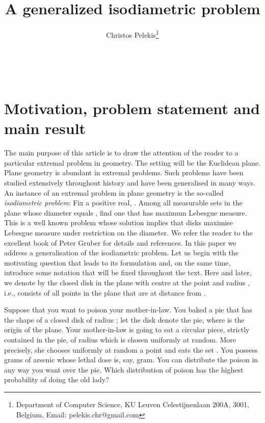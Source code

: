 \documentclass[12pt]{article}
\title{A generalized isodiametric problem}
\author{Christos Pelekis\thanks{Department of Computer Science, KU Leuven
Celestijnenlaan 200A,
3001, Belgium, Email: pelekis.chr@gmail.com}}
\begin{document}
\maketitle


\\

\section{Motivation, problem statement and main result}


The main purpose of this article is to draw the attention of the reader to a 
particular extremal problem in geometry.
The setting will be the Euclidean plane.  Plane geometry is abundant in extremal problems. 
Such problems have been studied extensively throughout history and have been generalised in many ways.
An instance of an extremal problem in plane geometry is the so-called \emph{isodiametric problem}: 
Fix a positive real, . 
Among all measurable sets in the plane whose
diameter equals , find one that has maximum Lebesgue measure. 
This is a well known problem whose solution implies that disks maximise Lebesgue measure 
under restriction on the diameter.
We refer the reader to the excellent book of Peter 
Gruber \cite{Gruber} for details and 
references.
In this paper we address a generalisation of the isodiametric problem. Let us begin
with the motivating question that leads to its formulation and, on the same time, 
introduce some notation 
that will be fixed throughout the text. 
Here and later, we denote by   the closed disk in the plane with centre at the point 
 and radius , i.e., 
 consists of all points in the plane that are at distance  from .  

Suppose that you want to poison your mother-in-law.
You baked a pie that has the shape of a closed disk of radius ; let the disk
 denote the pie, where  is the origin of the plane. 
Your mother-in-law is going to eat a circular piece,
strictly contained in the pie, of radius  which is chosen uniformly at random. 
More precisely, she chooses uniformly at random a point  
and eats the set .
You possess  grams of arsenic whose lethal dose is, say,  gram. 
You can distribute the poison in any way you want over the pie. Which distribution of poison has the 
highest probability of doing the old lady?
\end{document}
